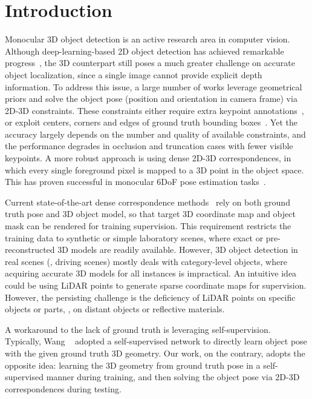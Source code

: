 \documentclass[10pt,twocolumn,letterpaper]{article}
\begin{document}
\section{Introduction}
Monocular 3D object detection is an active research area in computer vision. Although deep-learning-based 2D object detection has achieved remarkable progress~\cite{cascade, faster}, the 3D counterpart still poses a much greater challenge on accurate object localization, since a single image cannot provide explicit depth information. To address this issue, a large number of works leverage geometrical priors and solve the object pose (position and orientation in camera frame) via 2D-3D constraints. These constraints either require extra keypoint annotations~\cite{deep-manta, mono3d++}, or exploit centers, corners and edges of ground truth bounding boxes~\cite{RTM3D, 3dbbox}. 
Yet the accuracy largely depends on the number and quality of available constraints, and the performance degrades in occlusion and truncation cases with fewer visible keypoints. 
A more robust approach is using dense 2D-3D correspondences, in which every single foreground pixel is mapped to a 3D point in the object space. This 
has proven successful in monocular 6DoF pose estimation tasks~\cite{linemod}.

Current state-of-the-art dense correspondence methods~\cite{CDPN, pix2pose, DPOD} rely on both ground truth pose and 3D object model, so that target 3D coordinate map and object mask can be rendered for training supervision. This requirement restricts the training data to synthetic or simple laboratory scenes, where exact or pre-reconstructed 3D models are readily available. However, 3D object detection in real scenes (\eg, driving scenes) mostly deals with category-level objects, where acquiring accurate 3D models for all instances is impractical. An intuitive idea could be using LiDAR points to generate sparse coordinate maps for supervision. However, the persisting challenge is the deficiency of LiDAR points on specific objects or parts, \eg, on distant objects or reflective materials. 

A workaround to the lack of ground truth is leveraging self-supervision. Typically, Wang \etal~\cite{Self6D} adopted a self-supervised network to directly learn object pose with the given ground truth 3D geometry. Our work, on the contrary, adopts the opposite idea: learning the 3D geometry from ground truth pose in a self-supervised manner during training, and then solving the object pose via 2D-3D correspondences during testing. 
\end{document}
